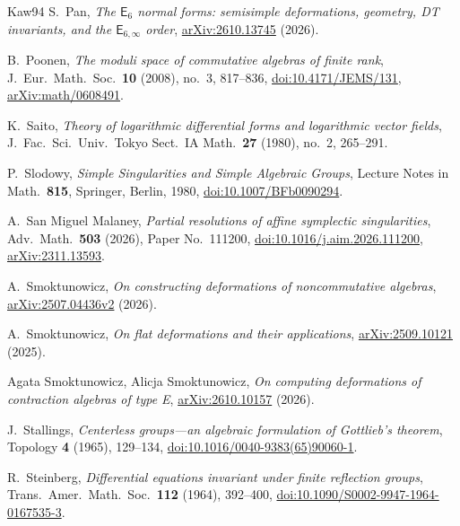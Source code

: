 \documentclass[11pt]{amsart}
\numberwithin{table}{section}
\numberwithin{figure}{section}
\numberwithin{equation}{section}
\theoremstyle{definition}
\theoremstyle{plain}
\begin{document}
\begin{thebibliography}{Kaw94}
S.~Pan, \emph{The $\mathsf{E}_6$ normal forms: semisimple deformations, geometry, DT invariants, and the $\mathsf{E}_{6,\infty}$ order}, \href{https://arxiv.org/abs/2610.13745}{arXiv:2610.13745} (2026).

B.~Poonen, \emph{The moduli space of commutative algebras of finite rank}, J.\ Eur.\ Math.\ Soc.\ \textbf{10} (2008), no.~3, 817--836, \href{https://doi.org/10.4171/JEMS/131}{doi:10.4171/JEMS/131}, \href{https://arxiv.org/abs/math/0608491}{arXiv:math/0608491}.

K.~Saito, \emph{Theory of logarithmic differential forms and logarithmic vector fields}, J.\ Fac.\ Sci.\ Univ.\ Tokyo Sect.\ IA Math.\ \textbf{27} (1980), no.~2, 265--291.

P.~Slodowy, \emph{Simple Singularities and Simple Algebraic Groups}, Lecture Notes in Math.\ \textbf{815}, Springer, Berlin, 1980, \href{https://doi.org/10.1007/BFb0090294}{doi:10.1007/BFb0090294}.

A.~San Miguel Malaney, \emph{Partial resolutions of affine symplectic singularities}, Adv.\ Math.\ \textbf{503} (2026), Paper No.~111200, \href{https://doi.org/10.1016/j.aim.2026.111200}{doi:10.1016/j.aim.2026.111200}, \href{https://arxiv.org/abs/2311.13593}{arXiv:2311.13593}.

A.~Smoktunowicz, \emph{On constructing deformations of noncommutative algebras}, \href{https://arxiv.org/abs/2507.04436v2}{arXiv:2507.04436v2} (2026).

A.~Smoktunowicz, \emph{On flat deformations and their applications}, \href{https://arxiv.org/abs/2509.10121}{arXiv:2509.10121} (2025).

Agata Smoktunowicz, Alicja Smoktunowicz, \emph{On computing deformations of contraction algebras of type E}, \href{https://arxiv.org/abs/2610.10157}{arXiv:2610.10157} (2026).

J.~Stallings, \emph{Centerless groups---an algebraic formulation of Gottlieb's theorem}, Topology \textbf{4} (1965), 129--134, \href{https://doi.org/10.1016/0040-9383(65)90060-1}{doi:10.1016/0040-9383(65)90060-1}.

R.~Steinberg, \emph{Differential equations invariant under finite reflection groups}, Trans.\ Amer.\ Math.\ Soc.\ \textbf{112} (1964), 392--400, \href{https://doi.org/10.1090/S0002-9947-1964-0167535-3}{doi:10.1090/S0002-9947-1964-0167535-3}.


\end{thebibliography}
\end{document}
